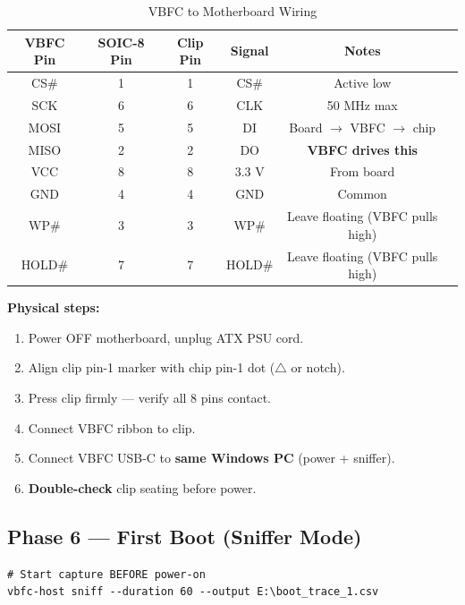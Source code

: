 \begin{table}[h]
\centering
\caption{VBFC to Motherboard Wiring}
\label{tab:wiring}
\begin{tabular}{@{}cccccl@{}}
\toprule
\textbf{VBFC Pin} & \textbf{SOIC-8 Pin} & \textbf{Clip Pin} & \textbf{Signal} & \textbf{Notes} \\
\midrule
CS\#      & 1 & 1 & CS\#    & Active low \\
SCK       & 6 & 6 & CLK     & 50 MHz max \\
MOSI      & 5 & 5 & DI      & Board $\to$ VBFC $\to$ chip \\
MISO      & 2 & 2 & DO      & \textbf{VBFC drives this} \\
VCC       & 8 & 8 & 3.3 V   & From board \\
GND       & 4 & 4 & GND     & Common \\
WP\#      & 3 & 3 & WP\#    & Leave floating (VBFC pulls high) \\
HOLD\#    & 7 & 7 & HOLD\#  & Leave floating (VBFC pulls high) \\
\bottomrule
\end{tabular}
\end{table}

\textbf{Physical steps:}
\begin{enumerate}
    \item Power OFF motherboard, unplug ATX PSU cord.
    \item Align clip pin-1 marker with chip pin-1 dot ($\triangle$ or notch).
    \item Press clip firmly — verify all 8 pins contact.
    \item Connect VBFC ribbon to clip.
    \item Connect VBFC USB-C to \textbf{same Windows PC} (power + sniffer).
    \item \textbf{Double-check} clip seating before power.
\end{enumerate}

\subsection*{Phase 6 — First Boot (Sniffer Mode)}

\begin{lstlisting}[style=vbfcStyle, caption={Start Sniffer Capture}]
# Start capture BEFORE power-on
vbfc-host sniff --duration 60 --output E:\boot_trace_1.csv
\end{lstlisting}

